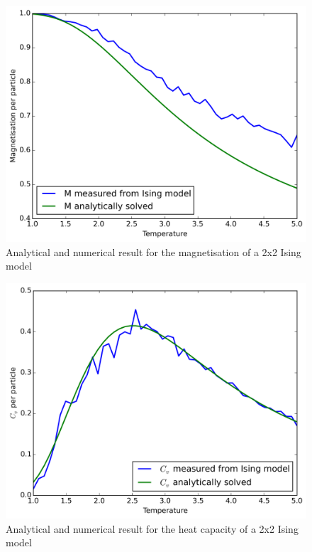 \documentclass[11pt,a4paper,final]{article}
\numberwithin{equation}{section}
\newcommand{\figurewidth}{.85\textwidth}
\begin{document}
\begin{figure}
\centering
\includegraphics[width=\figurewidth]{pics/aM.png}
\caption{Analytical and numerical result for the magnetisation 
of a 2x2 Ising model}
\label{fig:aM}
\end{figure}

\begin{figure}
\centering
\includegraphics[width=\figurewidth]{pics/acv.png}
\caption{Analytical and numerical result for the heat capacity 
of a 2x2 Ising model}
\label{fig:acv}
\end{figure}
\end{document}
